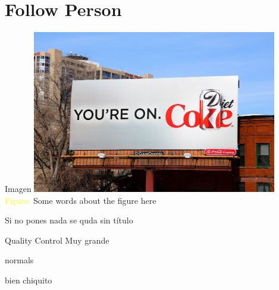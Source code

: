 \section{Follow Person}
     
    \frame{\sectionpage}
    
    \begin{frame}{Imagen}
        \centering
        \includegraphics[width = 0.8\textwidth]{images/coke.jpg}\\
        \footnotesize \textcolor{yellow}{Figure:} Some words about the figure here
    \end{frame}
        
    \begin{frame}{}
    Si no pones nada se quda sin título
    \end{frame}
 
    
    \begin{frame}{Quality Control}
        \centering
        \textcolor{green2}{\huge{Muy grande}}
        
        \normalsize{normals} 
        
        \tiny{bien chiquito}
    \end{frame}